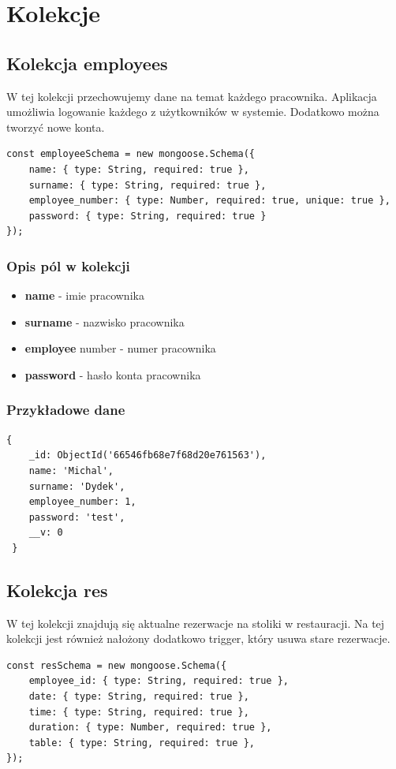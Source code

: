 \documentclass[12pt]{article}
\begin{document}
\section{Kolekcje}
\begin{samepage}
\subsection{Kolekcja employees}
W tej kolekcji przechowujemy dane na temat każdego pracownika. Aplikacja umożliwia logowanie każdego z użytkowników w systemie. Dodatkowo można tworzyć nowe konta.
\begin{lstlisting}[caption={Employees}]
const employeeSchema = new mongoose.Schema({
    name: { type: String, required: true },
    surname: { type: String, required: true },
    employee_number: { type: Number, required: true, unique: true },
    password: { type: String, required: true }
});
\end{lstlisting}
\end{samepage}
\subsubsection{Opis pól w kolekcji}

\begin{itemize}
	\item \textbf{name} - imie pracownika
	\item \textbf{surname} - nazwisko pracownika
	\item \textbf{employee} number - numer pracownika
	\item \textbf{password} - hasło konta pracownika
\end{itemize}

\subsubsection{Przykładowe dane}
\begin{lstlisting}[]
 {
    _id: ObjectId('66546fb68e7f68d20e761563'),
    name: 'Michal',
    surname: 'Dydek',
    employee_number: 1,
    password: 'test',
    __v: 0
 }
\end{lstlisting}


\newpage
\begin{samepage}
\subsection{Kolekcja res}
W tej kolekcji znajdują się aktualne rezerwacje na stoliki w restauracji. Na tej kolekcji jest również nałożony dodatkowo trigger, który usuwa stare rezerwacje.

\begin{lstlisting}[caption={Reservations}]
const resSchema = new mongoose.Schema({
    employee_id: { type: String, required: true },
    date: { type: String, required: true },
    time: { type: String, required: true },
    duration: { type: Number, required: true },
    table: { type: String, required: true },
});
\end{lstlisting}
\end{samepage}
\end{document}
